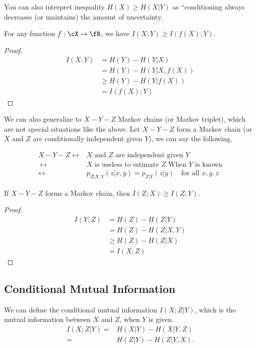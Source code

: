 \documentclass{article}
\begin{document}
You can also interpret inequality $H(X) \geq H(X|Y)$ as ``conditioning always decreases (or maintains) the amount of uncertainty.



\begin{theorem}
For any function $f:\cX \rightarrow \fR$, we have $I(X;Y) \geq I(f(X);Y)$.
\end{theorem}
\begin{proof}
\begin{align}
I(X;Y) &= H(Y) - H(Y|X) \\
&= H(Y) - H(Y|X,f(X)) \\
&\geq H(Y) - H(Y|f(X)) \\
&= I(f(X); Y) \label{eq:dataprocessing f}
\end{align}
\end{proof}

We can also generalize to $X-Y-Z$ Markov chains (or Markov triplet), which are not special situations like the above.
Let $X-Y-Z$ form a Markov chain (or $X$ and $Z$ are conditionally independent given $Y$), we can say the following.

\begin{align}
    X-Y-Z \leftrightarrow& X \text{ and } Z \text{ are independent given } Y\\\
    \leftrightarrow & X \text{ is useless to estimate } Z \text{ When } Y \text{ is known}\\
    \leftrightarrow & p_{Z|X,Y}(z|x,y) = p_{Z|Y}(z|y) \quad\mbox{for all $x, y, z$}
\end{align}

\begin{theorem}
    If $X-Y-Z$ forms a Markov chain, then $I(Z;X) \geq I(Z;Y)$.
\end{theorem}
\begin{proof}
\begin{align}
I(Y;Z) &= H(Z) - H(Z|Y) \\
      &= H(Z) - H(Z|X,Y) \\
      &\geq H(Z) - H(Z|X) \\
      &= I(X;Z)
\end{align}
\end{proof}

\subsection{Conditional Mutual Information}
We can define the conditional mutual information $I(X;Z|Y)$, which is the mutual information between $X$ and $Z$, when $Y$ is given.
\begin{align}
    I(X;Z|Y) =& H(X|Y) - H(X|Y, Z)\\
    =& H(Z|Y) - H(Z|Y, X).
\end{align}
\end{document}
